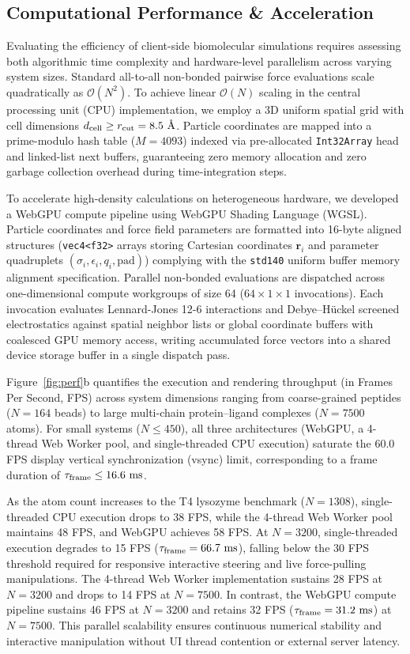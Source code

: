\documentclass[journal=jpcbfk,manuscript=article]{achemso}
\begin{document}
\subsection{Computational Performance \& Acceleration}
Evaluating the efficiency of client-side biomolecular simulations requires assessing both algorithmic time complexity and hardware-level parallelism across varying system sizes. Standard all-to-all non-bonded pairwise force evaluations scale quadratically as $\mathcal{O}(N^2)$. To achieve linear $\mathcal{O}(N)$ scaling in the central processing unit (CPU) implementation, we employ a 3D uniform spatial grid with cell dimensions $d_{\rm cell} \ge r_{\rm cut} = 8.5\text{ \AA}$. Particle coordinates are mapped into a prime-modulo hash table ($M = 4093$) indexed via pre-allocated \texttt{Int32Array} head and linked-list next buffers, guaranteeing zero memory allocation and zero garbage collection overhead during time-integration steps.

To accelerate high-density calculations on heterogeneous hardware, we developed a WebGPU compute pipeline using WebGPU Shading Language (WGSL). Particle coordinates and force field parameters are formatted into 16-byte aligned structures (\texttt{vec4<f32>} arrays storing Cartesian coordinates $\mathbf{r}_i$ and parameter quadruplets $(\sigma_i, \epsilon_i, q_i, \text{pad})$) complying with the \texttt{std140} uniform buffer memory alignment specification. Parallel non-bonded evaluations are dispatched across one-dimensional compute workgroups of size 64 ($64 \times 1 \times 1$ invocations). Each invocation evaluates Lennard-Jones 12-6 interactions and Debye--H\"uckel screened electrostatics against spatial neighbor lists or global coordinate buffers with coalesced GPU memory access, writing accumulated force vectors into a shared device storage buffer in a single dispatch pass.

Figure~\ref{fig:perf}b quantifies the execution and rendering throughput (in Frames Per Second, FPS) across system dimensions ranging from coarse-grained peptides ($N = 164$ beads) to large multi-chain protein--ligand complexes ($N = 7500$ atoms). For small systems ($N \le 450$), all three architectures (WebGPU, a 4-thread Web Worker pool, and single-threaded CPU execution) saturate the 60.0 FPS display vertical synchronization (vsync) limit, corresponding to a frame duration of $\tau_{\rm frame} \le 16.6\text{ ms}$.

As the atom count increases to the T4 lysozyme benchmark ($N = 1308$), single-threaded CPU execution drops to 38 FPS, while the 4-thread Web Worker pool maintains 48 FPS, and WebGPU achieves 58 FPS. At $N = 3200$, single-threaded execution degrades to 15 FPS ($\tau_{\rm frame} = 66.7\text{ ms}$), falling below the 30 FPS threshold required for responsive interactive steering and live force-pulling manipulations. The 4-thread Web Worker implementation sustains 28 FPS at $N = 3200$ and drops to 14 FPS at $N = 7500$. In contrast, the WebGPU compute pipeline sustains 46 FPS at $N = 3200$ and retains 32 FPS ($\tau_{\rm frame} = 31.2\text{ ms}$) at $N = 7500$. This parallel scalability ensures continuous numerical stability and interactive manipulation without UI thread contention or external server latency.
\end{document}
